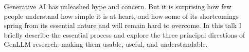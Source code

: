 Generative AI has unleashed hype and concern. But it is surprising how few people understand how simple it is at heart, and how some of its shortcomings spring from its essential nature and will remain hard to overcome. In this talk I briefly describe the essential process and explore the three principal directions of GenLLM research: making them usable, useful, and understandable.